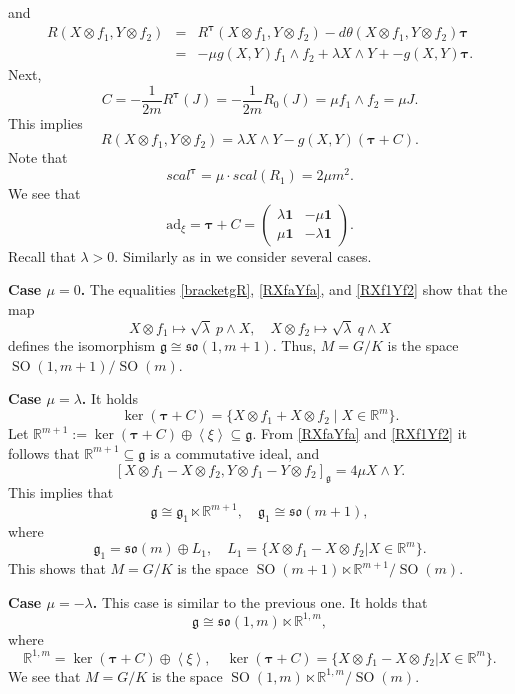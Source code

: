 \documentclass{amsart}
\theoremstyle{plain}
\theoremstyle{definition}
\newcommand{\SO}{\operatorname{SO}}
\def\so{\mathfrak{so}}
\newcommand{\bt}{{\boldsymbol{\tau}}}
\newcommand{\Real}{\mathbb{R}}
\newcommand{\1}{\mathbf{1}}
\newcommand{\ad}{\mathrm{ad}}
\newcommand{\g}{\mathfrak{g}}
\newcommand{\+}{\oplus}
\begin{document}
and 
\begin{eqnarray*}%
R(X\otimes f_1, Y\otimes f_2)&=&R^\bt(X\otimes f_1, Y\otimes f_2)-d\theta(X\otimes f_1, Y\otimes f_2)\bt\\
&=&-\mu g(X,Y)f_1\wedge f_2+\lambda X\wedge Y+-g(X,Y)\bt.\end{eqnarray*}
Next, $$C=-\frac{1}{2m}R^\bt(J)=-\frac{1}{2m}R_0(J) =\mu f_1\wedge f_2=\mu J.$$
This implies
\begin{equation}\label{RXf1Yf2}R(X\otimes f_1, Y\otimes f_2)=\lambda X\wedge Y-g(X,Y)(\bt+C).\end{equation}
Note that
$$scal^\bt=\mu\cdot scal(R_1)=2\mu m^2.$$ 
We see that
$$\ad_\xi=\bt+C=\left(\begin{matrix} \lambda\1& -\mu \1\\\mu \1& -\lambda \1 \end{matrix}\right).$$
Recall that $\lambda>0$. Similarly as in \cite{FGR} we consider several cases.

\bigskip

{\bf Case $\mu=0$.} 
The equalities \eqref{bracketgR}, \eqref{RXfaYfa}, and \eqref{RXf1Yf2}   show that the map $$X\otimes f_1\mapsto \sqrt{\lambda}\ p\wedge X,\quad  X\otimes f_2\mapsto \sqrt{\lambda} \ q\wedge X$$
defines the isomorphism $\g\cong\so(1,m+1)$. Thus,
$M=G/K$ is the space $\SO(1,m+1)/\SO(m)$. 

\bigskip

{\bf Case $\mu=\lambda$.} It holds
$$\ker (\bt+C)=\{X\otimes f_1+X\otimes f_2\mid X\in\Real^m\}.$$ Let  $\Real^{m+1}:=\ker (\bt+C)\oplus\left<\xi\right>\subseteq\g$. From \eqref{RXfaYfa} and \eqref{RXf1Yf2} it follows that $\Real^{m+1}\subseteq \g$ is a commutative ideal, and 
$$[X\otimes f_1-X\otimes f_2,Y\otimes f_1-Y\otimes f_2]_\g=4\mu X\wedge Y.$$
This implies that 
$$\g\cong \g_1\ltimes \Real^{m+1},\quad \g_1\cong\so(m+1),$$ where
$$\g_1=\so(m)\oplus L_1,\quad L_1=\{X\otimes f_1-X\otimes f_2|X\in\Real^m\}.$$
This shows that 
$M=G/K$ is the space $\SO(m+1)\ltimes\Real^{m+1}/\SO(m)$. 

\bigskip

{\bf Case $\mu=-\lambda$.} This case is similar to the previous one. It holds that
$$\g\cong \so(1,m)\ltimes\Real^{1,m},$$
where 
$$\Real^{1,m}=\ker (\bt+C)\oplus\left<\xi\right>,\quad 
\ker (\bt+C)=\{X\otimes f_1-X\otimes f_2|X\in\Real^m\}.$$
We see that 
$M=G/K$ is the space $\SO(1,m)\ltimes\Real^{1,m}/\SO(m)$. 

\bigskip
\end{document}
